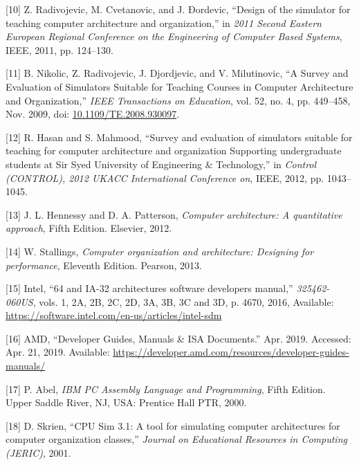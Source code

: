 \documentclass[12pt,twoside]{templates/unerthesis}
\newenvironment{cslreferences}%
  {}%
  {\par}
\begin{document}
\begin{cslreferences}
\leavevmode\hypertarget{ref-radivojevic_design_2011}{}%
{[}10{]} Z. Radivojevic, M. Cvetanovic, and J. Ðordevic, ``Design of the simulator for teaching computer architecture and organization,'' in \emph{2011 Second Eastern European Regional Conference on the Engineering of Computer Based Systems}, IEEE, 2011, pp. 124--130.

\leavevmode\hypertarget{ref-nikolic_survey_2009}{}%
{[}11{]} B. Nikolic, Z. Radivojevic, J. Djordjevic, and V. Milutinovic, ``A Survey and Evaluation of Simulators Suitable for Teaching Courses in Computer Architecture and Organization,'' \emph{IEEE Transactions on Education}, vol. 52, no. 4, pp. 449--458, Nov. 2009, doi: \href{https://doi.org/10.1109/TE.2008.930097}{10.1109/TE.2008.930097}.

\leavevmode\hypertarget{ref-hasan_survey_2012}{}%
{[}12{]} R. Hasan and S. Mahmood, ``Survey and evaluation of simulators suitable for teaching for computer architecture and organization Supporting undergraduate students at Sir Syed University of Engineering \& Technology,'' in \emph{Control (CONTROL), 2012 UKACC International Conference on}, IEEE, 2012, pp. 1043--1045.

\leavevmode\hypertarget{ref-hennessy_computer_2012}{}%
{[}13{]} J. L. Hennessy and D. A. Patterson, \emph{Computer architecture: A quantitative approach}, Fifth Edition. Elsevier, 2012.

\leavevmode\hypertarget{ref-stallings_computer_2013}{}%
{[}14{]} W. Stallings, \emph{Computer organization and architecture: Designing for performance}, Eleventh Edition. Pearson, 2013.

\leavevmode\hypertarget{ref-intel_64_2016}{}%
{[}15{]} Intel, ``64 and IA-32 architectures software developers manual,'' \emph{325462-060US}, vols. 1, 2A, 2B, 2C, 2D, 3A, 3B, 3C and 3D, p. 4670, 2016, Available: \url{https://software.intel.com/en-us/articles/intel-sdm}

\leavevmode\hypertarget{ref-amd_developer_2019}{}%
{[}16{]} AMD, ``Developer Guides, Manuals \& ISA Documents.'' Apr. 2019. Accessed: Apr. 21, 2019. Available: \url{https://developer.amd.com/resources/developer-guides-manuals/}

\leavevmode\hypertarget{ref-abel_ibm_2000}{}%
{[}17{]} P. Abel, \emph{IBM PC Assembly Language and Programming}, Fifth Edition. Upper Saddle River, NJ, USA: Prentice Hall PTR, 2000.

\leavevmode\hypertarget{ref-skrien_cpu_2001}{}%
{[}18{]} D. Skrien, ``CPU Sim 3.1: A tool for simulating computer architectures for computer organization classes,'' \emph{Journal on Educational Resources in Computing (JERIC)}, 2001.


\end{cslreferences}
\end{document}
